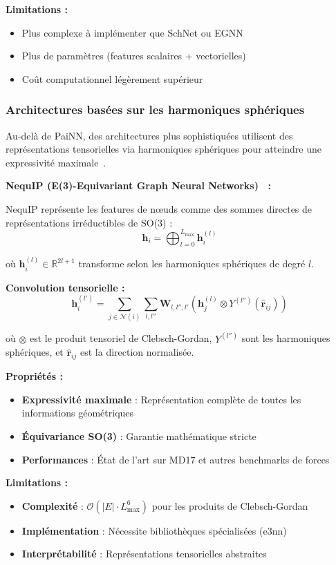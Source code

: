 \textbf{Limitations :}
\begin{itemize}
    \item Plus complexe à implémenter que SchNet ou EGNN
    \item Plus de paramètres (features scalaires + vectorielles)
    \item Coût computationnel légèrement supérieur
\end{itemize}

\subsubsection{Architectures basées sur les harmoniques sphériques}

Au-delà de PaiNN, des architectures plus sophistiquées utilisent des représentations tensorielles via harmoniques sphériques pour atteindre une expressivité maximale~\cite{Duval2024}.

\textbf{NequIP (E(3)-Equivariant Graph Neural Networks)~\cite{Batzner2022} :}

NequIP représente les features de nœuds comme des sommes directes de représentations irréductibles de SO(3) :
\[
\mathbf{h}_i = \bigoplus_{l=0}^{L_{\max}} \mathbf{h}_i^{(l)}
\]

où $\mathbf{h}_i^{(l)} \in \mathbb{R}^{2l+1}$ transforme selon les harmoniques sphériques de degré $l$.

\textbf{Convolution tensorielle :}
\[
\mathbf{h}_i^{(l')} = \sum_{j \in \mathcal{N}(i)} \sum_{l, l''} \mathbf{W}_{l,l'',l'} \left(\mathbf{h}_j^{(l)} \otimes Y^{(l'')}(\hat{\mathbf{r}}_{ij})\right)
\]

où $\otimes$ est le produit tensoriel de Clebsch-Gordan, $Y^{(l'')}$ sont les harmoniques sphériques, et $\hat{\mathbf{r}}_{ij}$ est la direction normalisée.

\textbf{Propriétés :}
\begin{itemize}
    \item \textbf{Expressivité maximale} : Représentation complète de toutes les informations géométriques
    \item \textbf{Équivariance SO(3)} : Garantie mathématique stricte
    \item \textbf{Performances} : État de l'art sur MD17 et autres benchmarks de forces
\end{itemize}

\textbf{Limitations :}
\begin{itemize}
    \item \textbf{Complexité} : $\mathcal{O}(|E| \cdot L_{\max}^6)$ pour les produits de Clebsch-Gordan
    \item \textbf{Implémentation} : Nécessite bibliothèques spécialisées (e3nn)
    \item \textbf{Interprétabilité} : Représentations tensorielles abstraites
\end{itemize}

